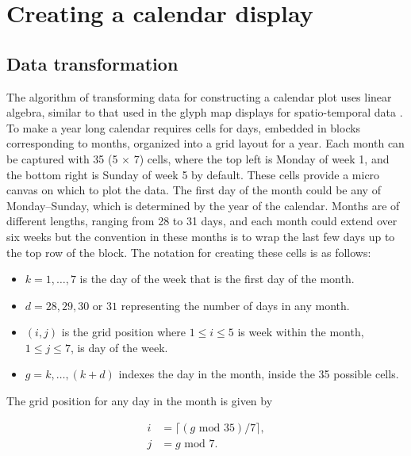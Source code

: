 \documentclass[12pt]{article}
\providecommand{\tightlist}{%
  \setlength{\itemsep}{0pt}\setlength{\parskip}{0pt}}
\begin{document}
\hypertarget{sec:algorithm}{%
\section{Creating a calendar display}\label{sec:algorithm}}

\hypertarget{sec:transformation}{%
\subsection{Data transformation}\label{sec:transformation}}

The algorithm of transforming data for constructing a calendar plot uses linear algebra, similar to that used in the glyph map displays for spatio-temporal data \citep{Wickham2012glyph}. To make a year long calendar requires cells for days, embedded in blocks corresponding to months, organized into a grid layout for a year. Each month can be captured with 35 (5 \(\times\) 7) cells, where the top left is Monday of week 1, and the bottom right is Sunday of week 5 by default. These cells provide a micro canvas on which to plot the data. The first day of the month could be any of Monday--Sunday, which is determined by the year of the calendar. Months are of different lengths, ranging from 28 to 31 days, and each month could extend over six weeks but the convention in these months is to wrap the last few days up to the top row of the block. The notation for creating these cells is as follows:

\begin{itemize}
\tightlist
\item
  \(k = 1, \dots , 7\) is the day of the week that is the first day of the month.
\item
  \(d = 28, 29, 30\) or \(31\) representing the number of days in any month.
\item
  \((i, j)\) is the grid position where \(1 \le i \le 5\) is week within the month, \(1 \le j \le 7\), is day of the week.
\item
  \(g = k, \dots,(k+d)\) indexes the day in the month, inside the 35 possible cells.
\end{itemize}

The grid position for any day in the month is given by

\begin{equation}
  \begin{aligned}
  i &= \lceil (g \text{ mod } 35) / 7\rceil, \\
  j &= g \text{ mod } 7.
  \end{aligned}
  \label{eq:grid}
\end{equation}
\end{document}
